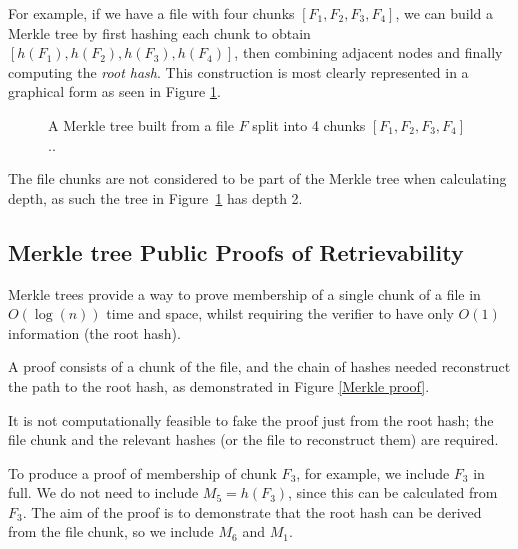 \documentclass[12pt,a4paper,twoside,openright]{report}
\begin{document}
For example, if we have a file with four chunks $\left[F_1, F_2, F_3, F_4\right]$, we can build a Merkle tree by first hashing each chunk to obtain $\left[h(F_1), h(F_2), h(F_3), h(F_4)\right]$,
then combining adjacent nodes and finally computing the \textit{root hash}. 
This construction is most clearly represented in a graphical form as seen in Figure \ref{Merkle example}.


\begin{figure}[h]
\centering
{}
\caption[A Merkle Tree]{A Merkle tree built from a file $F$ split into 4 chunks $[F_1, F_2, F_3, F_4]$..}
\label{Merkle example}
\end{figure}

The file chunks are not considered to be part of the Merkle tree when calculating depth, as such the tree in Figure~\ref{Merkle example} has depth 2.



\subsection{Merkle tree Public Proofs of Retrievability}\label{merkle-ppor}

Merkle trees provide a way to prove membership of a single chunk of a file in $O(\log(n))$ time and space,
whilst requiring the verifier to have only $O(1)$ information (the root hash).

A proof consists of a chunk of the file, and the chain of hashes needed reconstruct the path to the root hash,
as demonstrated in Figure \ref{Merkle proof}.

It is not computationally feasible to fake the proof just from the root hash; the file chunk and the relevant hashes (or the file to reconstruct them) are required.

To produce a proof of membership of chunk $F_3$, for example, we include $F_3$ in full.
We do not need to include $M_5 = h(F_3)$, since this can be calculated from $F_3$.
The aim of the proof is to demonstrate that the root hash can be derived from the file chunk, so we include $M_6$ and $M_1$.
\end{document}
